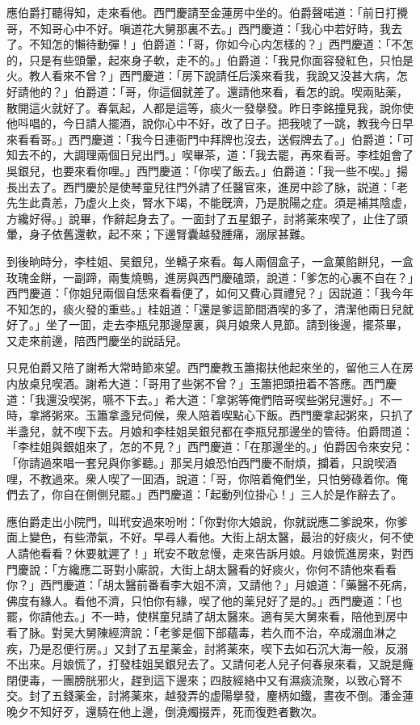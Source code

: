 應伯爵打聽得知，走來看他。西門慶請至金蓮房中坐的。伯爵聲喏道：「前日打攪哥，不知哥心中不好。嗔道花大舅那裏不去。」西門慶道：「我心中若好時，我去了。不知怎的懶待動彈！」伯爵道：「哥，你如今心内怎樣的？」西門慶道：「不怎的，只是有些頭暈，起來身子軟，走不的。」伯爵道：「我見你面容發紅色，只怕是火。教人看來不曾？」西門慶道：「房下說請任后溪來看我，我說又没甚大病，怎好請他的？」伯爵道：「哥，你這個就差了。還請他來看，看怎的說。喫兩貼薬，散開這火就好了。春氣起，人都是這等，痰火一發擧發。昨日李銘撞見我，說你使他呌唱的，今日請人擺酒，說你心中不好，改了日子。把我唬了一跳，教我今日早來看看哥。」西門慶道：「我今日連衙門中拜牌也沒去，送假牌去了。」伯爵道：「可知去不的，大調理兩個日兒出門。」喫畢茶，道：「我去罷，再來看哥。李桂姐會了吳銀兒，也要來看你哩。」西門慶道：「你喫了飯去。」伯爵道：「我一些不喫。」揚長出去了。西門慶於是使琴童兒往門外請了任醫官來，進房中診了脉，説道：「老先生此貴恙，乃虚火上炎，腎水下竭，不能旣濟，乃是脱陽之症。須是補其陰虚，方纔好得。」說畢，作辭起身去了。一面封了五星銀子，討將薬來喫了，止住了頭暈，身子依舊還軟，起不來；下邊腎囊越發腫痛，溺尿甚難。

到後晌時分，李桂姐、吴銀兒，坐轎子來看。每人兩個盒子，一盒菓餡餅兒，一盒玫瑰金餅，一副蹄，兩隻燒鴨，進房與西門慶磕頭，說道：「爹怎的心裏不自在？」西門慶道：「你姐兒兩個自恁來看看便了，如何又費心買禮兒？」因説道：「我今年不知怎的，痰火發的重些。」桂姐道：「還是爹這節間酒喫的多了，清潔他兩日兒就好了。」坐了一囬，走去李瓶兒那邊屋裏，與月娘衆人見節。請到後邊，擺茶畢，又走來前邊，陪西門慶坐的説話兒。

只見伯爵又陪了謝希大常時節來望。西門慶教玉簫搊扶他起來坐的，留他三人在房内放桌兒喫酒。謝希大道：「哥用了些粥不曾？」玉簫把頭扭着不答應。西門慶道：「我還没喫粥，嚥不下去。」希大道：「拿粥等俺們陪哥喫些粥兒還好。」不一時，拿將粥來。玉簫拿盞兒伺候，衆人陪着喫點心下飯。西門慶拿起粥來，只扒了半盞兒，就不喫下去。月娘和李桂姐吴銀兒都在李瓶兒那邊坐的管待。伯爵問道：「李桂姐與銀姐來了，怎的不見？」西門慶道：「在那邊坐的。」伯爵因令來安兒：「你請過來唱一套兒與你爹聽。」那吴月娘恐怕西門慶不耐煩，攔着，只說喫酒哩，不教過來。衆人喫了一囬酒，說道：「哥，你陪着俺們坐，只怕勞碌着你。俺們去了，你自在側側兒罷。」西門慶道：「起動列位掛心！」三人於是作辭去了。

應伯爵走出小院門，叫玳安過來吩咐：「你對你大娘說，你就説應二爹說來，你爹面上變色，有些滯氣，不好。早尋人看他。大街上胡太醫，最治的好痰火，何不使人請他看看？休要躭遲了！」玳安不敢怠慢，走來告訴月娘。月娘慌進房來，對西門慶說：「方纔應二哥對小廝說，大街上胡太醫看的好痰火，你何不請他來看看你？」西門慶道：「胡太醫前番看李大姐不濟，又請他？」月娘道：「藥醫不死病，佛度有緣人。看他不濟，只怕你有緣，喫了他的薬兒好了是的。」西門慶道：「也罷，你請他去。」不一時，使棋童兒請了胡太醫來。適有吴大舅來看，陪他到房中看了脉。對吴大舅陳經濟說：「老爹是個下部蘊毒，若久而不治，卒成溺血淋之疾，乃是忍便行房。」又封了五星薬金，討將薬來，喫下去如石沉大海一般，反溺不出來。月娘慌了，打發桂姐吴銀兒去了。又請何老人兒子何春泉來看，又說是癃閉便毒，一團膀胱邪火，趕到這下邊來；四肢經絡中又有濕痰流聚，以致心腎不交。封了五錢薬金，討將薬來，越發弄的虚陽擧發，麈柄如鐵，晝夜不倒。潘金蓮晚夕不知好歹，還騎在他上邊，倒澆燭掇弄，死而復甦者數次。

